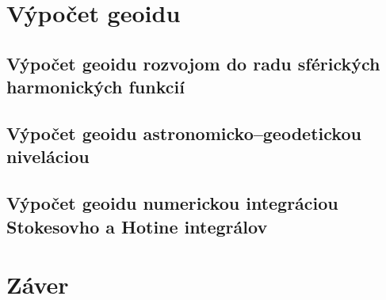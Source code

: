 \documentclass[a4paper, 12pt]{book}
\begin{document}

\chapter{Výpočet geoidu}







\section{Výpočet geoidu rozvojom do radu sférických harmonických funkcií}







\section{Výpočet geoidu astronomicko--geodetickou niveláciou}







\section{Výpočet geoidu numerickou integráciou Stokesovho a Hotine integrálov}







\chapter*{Záver}









\end{document}
